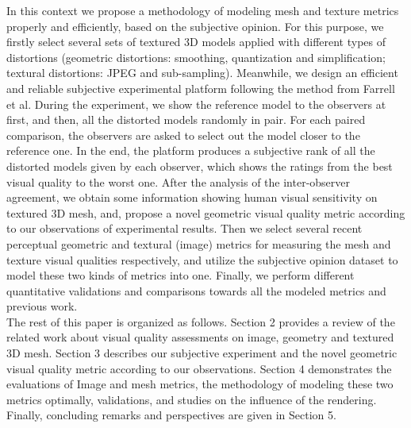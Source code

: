 In this context we propose a methodology of modeling mesh and texture metrics properly and efficiently, based on the subjective opinion. For this purpose, we firstly select several sets of textured 3D models applied with different types of distortions (geometric distortions: smoothing, quantization and simplification; textural distortions: JPEG and sub-sampling). Meanwhile, we design an efficient and reliable subjective experimental platform following the method from Farrell et al\cite{Farrell_2001}. During the experiment, we show the reference model to the observers at first, and then, all the distorted models randomly in pair. For each paired comparison, the observers are asked to select out the model closer to the reference one. In the end, the platform produces a subjective rank of all the distorted models given by each observer, which shows the ratings from the best visual quality to the worst one. After the analysis of the inter-observer agreement, we obtain some information showing human visual sensitivity on textured 3D mesh, and, propose a novel geometric visual quality metric according to our observations of experimental results. Then we select several recent perceptual geometric and textural (image) metrics for measuring the mesh and texture visual qualities respectively, and utilize the subjective opinion dataset to model these two kinds of metrics into one. Finally, we perform different quantitative validations and comparisons towards all the modeled metrics and previous work.\\
The rest of this paper is organized as follows. Section 2 provides a review of the related work about visual quality assessments on image, geometry and textured 3D mesh.  Section 3 describes our subjective experiment and the novel geometric visual quality metric according to our observations.
Section 4 demonstrates the evaluations of Image and mesh metrics, the methodology of modeling these two  metrics optimally, validations, and studies on the influence of the rendering. Finally, concluding remarks and perspectives are given in Section 5.